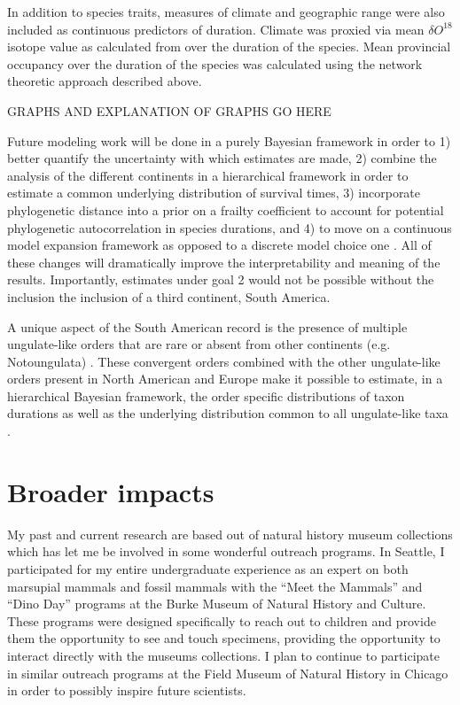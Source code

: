 \documentclass[11pt,letterpaper]{article}
\begin{document}
In addition to species traits, measures of climate and geographic range were also included as continuous predictors of duration. Climate was proxied via mean \(\delta O^{18}\) isotope value as calculated from \citet{Zachos2008} over the duration of the species. Mean provincial occupancy over the duration of the species was calculated using the network theoretic approach described above.

\uppercase{graphs and explanation of graphs go here}

Future modeling work will be done in a purely Bayesian framework in order to 1) better quantify the uncertainty with which estimates are made, 2) combine the analysis of the different continents in a hierarchical framework in order to estimate a common underlying distribution of survival times, 3) incorporate phylogenetic distance into a prior on a frailty coefficient \citep{Banerjee2003a,Ibrahim2001} to account for potential phylogenetic autocorrelation in species durations, and 4) to move on a continuous model expansion framework as opposed to a discrete model choice one \citep{Gelman2013d}. All of these changes will dramatically improve the interpretability and meaning of the results. Importantly, estimates under goal 2 would not be possible without the inclusion the inclusion of a third continent, South America. 

A unique aspect of the South American record is the presence of multiple ungulate-like orders that are rare or absent from other continents (e.g. Notoungulata) \citep{Marshall1982,Macfadden1997,Macfadden2006,Flynn1998a}. These convergent orders combined with the other ungulate-like orders present in North American and Europe make it possible to estimate, in a hierarchical Bayesian framework, the order specific distributions of taxon durations as well as the underlying distribution common to all ungulate-like taxa \citep{Gelman2013d}.


\section{Broader impacts}

My past and current research are based out of natural history museum collections which has let me be involved in some wonderful outreach programs. In Seattle, I participated for my entire undergraduate experience as an expert on both marsupial mammals and fossil mammals with the ``Meet the Mammals'' and ``Dino Day'' programs at the Burke Museum of Natural History and Culture. These programs were designed specifically to reach out to children and provide them the opportunity to see and touch specimens, providing the opportunity to interact directly with the museums collections. I plan to continue to participate in similar outreach programs at the Field Museum of Natural History in Chicago in order to possibly inspire future scientists. %
\end{document}
